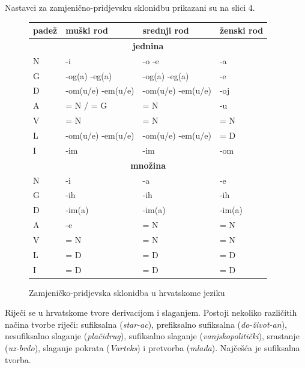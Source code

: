 \begin{multicols}{2}
Nastavci za zamjenično-pridjevsku sklonidbu prikazani su na slici 4.

\begin{figure}[htb]
\centering
    \begin{tabular}{|l|l|l|l|}
        \hline
        \textbf{padež} & \textbf{muški rod}         & \textbf{srednji rod}        & \textbf{ženski rod} \\ \hline
		\multicolumn{4}{|c|}{\textbf{jednina}} \\ \hline
        N     & -i                & -o -e             & -a          \\ 
        G     & -og(a) -eg(a)     & -og(a) -eg(a)     & -e          \\ 
        D     & -om(u/e) -em(u/e) & -om(u/e) -em(u/e) & -oj         \\ 
        A     & = N / = G         & = N               & -u          \\ 
        V     & = N               & = N               & = N         \\ 
        L     & -om(u/e) -em(u/e) & -om(u/e) -em(u/e) & = D         \\ 
        I     & -im               & -im               & -om         \\ \hline
		\multicolumn{4}{|c|}{\textbf{množina}} \\ \hline
		N     & -i        & -a         & -e          \\ 
        G     & -ih       & -ih        & -ih         \\ 
        D     & -im(a)    & -im(a)     & -im(a)      \\ 
        A     & -e        & = N        & = N         \\ 
        V     & = N       & = N        & = N         \\ 
        L     & = D       & = D        & = D         \\ 
        I     & = D       & = D        & = D         \\
        \hline
   \end{tabular}
  \caption{Zamjeničko-pridjevska sklonidba u hrvatskome jeziku}
  \label{fig:zamjenicka}
\end{figure}

Riječi se u hrvatskome tvore derivacijom i slaganjem. Postoji nekoliko različitih načina tvorbe riječi: sufiksalna (\emph{star-ac}), prefiksalno sufiksalna (\emph{do-život-an}), nesufiksalno slaganje (\emph{plačidrug}), sufiksalno slaganje (\emph{vanjskopolitički}), srastanje (\emph{uz-brdo}), slaganje pokrata (\emph{Varteks}) i pretvorba (\emph{mlada}). Najčešća je sufiksalna tvorba.


\end{multicols}
